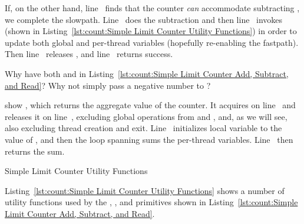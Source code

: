 \begin{lineref}
If, on the other hand, line~ finds that the counter \emph{can}
accommodate subtracting , we complete the slowpath.
Line~ does the subtraction and then
line~ invokes  (shown in
Listing~\ref{lst:count:Simple Limit Counter Utility Functions})
in order to update both global and per-thread variables
(hopefully re-enabling the fastpath).
Then line~ releases , and
line~ returns success.
\end{lineref}

\QuickQuiz{}
	Why have both  and  in
	Listing~\ref{lst:count:Simple Limit Counter Add, Subtract, and Read}?
	Why not simply pass a negative number to ?
 \QuickQuizEnd

\begin{lineref}
 show ,
which returns the aggregate value
of the counter.
It acquires  on line~
and releases it on line~,
excluding global operations from  and ,
and, as we will see, also excluding thread creation and exit.
Line~ initializes local variable  to the value of
, and then the loop spanning
 sums the
per-thread  variables.
Line~ then returns the sum.
\end{lineref}

\begin{listing}[tbp]

\caption{Simple Limit Counter Utility Functions}
\label{lst:count:Simple Limit Counter Utility Functions}
\end{listing}

Listing~\ref{lst:count:Simple Limit Counter Utility Functions}
shows a number of utility functions used by the ,
, and  primitives shown in
Listing~\ref{lst:count:Simple Limit Counter Add, Subtract, and Read}.

